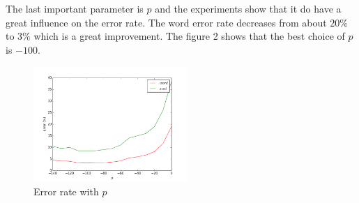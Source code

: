 \documentclass{article}
\begin{document}
The last important parameter is $p$ and the experiments show that it do have a great influence on the error rate. The word error rate decreases from about $20\%$ to $3\%$ which is a great improvement. The figure 2 shows that the best choice of $p$ is $-100$. 
\begin{figure}
\begin{center}
  \includegraphics[width=0.52\textwidth]{err_p.png}
  \caption{Error rate with $p$}\label{err_p}
\end{center}
\end{figure}
\end{document}
